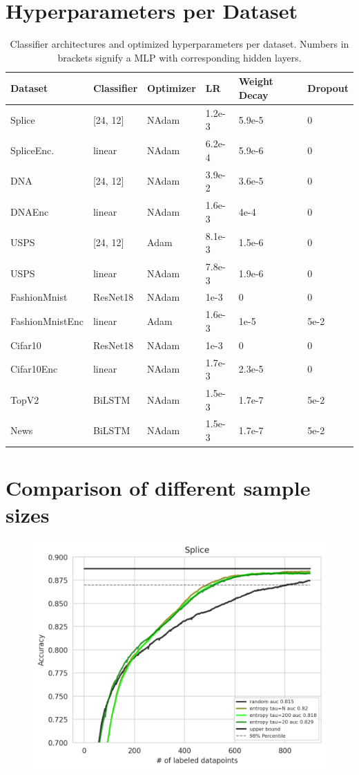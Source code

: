 \documentclass[]{article}
\begin{document}
\section{Hyperparameters per Dataset}\label{app:hyperparameters}
\begin{table}[H]
	\centering
	\begin{tabular}{l || l | l l l l}
		Dataset & Classifier & Optimizer & LR & Weight Decay & Dropout \\
		\hline
		Splice & [24, 12] & NAdam & 1.2e-3 & 5.9e-5 & 0 \\
		SpliceEnc. & linear & NAdam & 6.2e-4 & 5.9e-6 & 0 \\
		DNA & [24, 12] & NAdam & 3.9e-2 & 3.6e-5 & 0 \\
		DNAEnc & linear & NAdam & 1.6e-3 & 4e-4 & 0 \\
		USPS & [24, 12] & Adam & 8.1e-3 & 1.5e-6 & 0 \\
		USPS & linear & NAdam & 7.8e-3 & 1.9e-6 & 0 \\
		FashionMnist & ResNet18 & NAdam & 1e-3 & 0 & 0 \\
		FashionMnistEnc & linear & Adam & 1.6e-3 & 1e-5 & 5e-2 \\
		Cifar10 & ResNet18 & NAdam & 1e-3 & 0 & 0 \\
		Cifar10Enc & linear & NAdam & 1.7e-3 & 2.3e-5 & 0 \\
		TopV2 & BiLSTM & NAdam & 1.5e-3 & 1.7e-7 & 5e-2 \\
		News & BiLSTM & NAdam & 1.5e-3 & 1.7e-7 & 5e-2 \\
	\end{tabular}
	\caption{Classifier architectures and optimized hyperparameters per dataset. Numbers in brackets signify a MLP with corresponding hidden layers.}
	\label{tab:architectures}
\end{table}


\section{Comparison of different sample sizes}
\begin{figure}[H]
\centering
\includegraphics[width=0.7\linewidth]{img/tau_ablation.png}
\end{figure}
\end{document}
